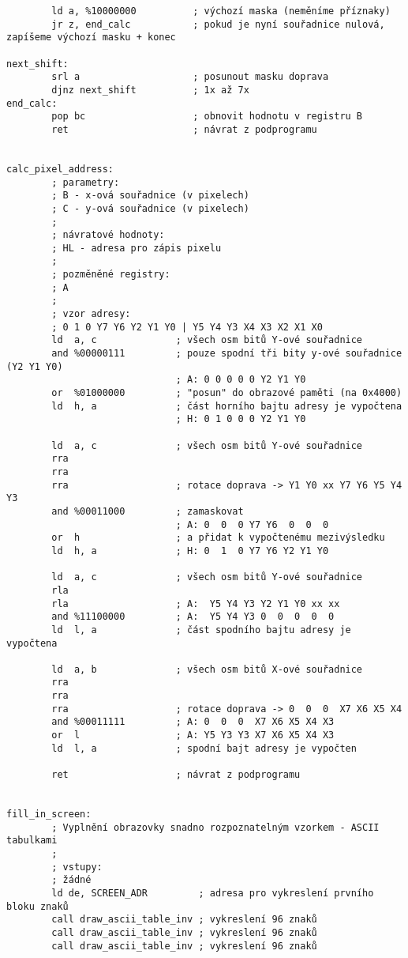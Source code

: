 \documentclass{article}
\begin{document}
\begin{verbatim}
        ld a, %10000000          ; výchozí maska (neměníme příznaky)
        jr z, end_calc           ; pokud je nyní souřadnice nulová, zapíšeme výchozí masku + konec
 
next_shift:
        srl a                    ; posunout masku doprava
        djnz next_shift          ; 1x až 7x
end_calc:
        pop bc                   ; obnovit hodnotu v registru B
        ret                      ; návrat z podprogramu
 
 
calc_pixel_address:
        ; parametry:
        ; B - x-ová souřadnice (v pixelech)
        ; C - y-ová souřadnice (v pixelech)
        ;
        ; návratové hodnoty:
        ; HL - adresa pro zápis pixelu
        ;
        ; pozměněné registry:
        ; A
        ;
        ; vzor adresy:
        ; 0 1 0 Y7 Y6 Y2 Y1 Y0 | Y5 Y4 Y3 X4 X3 X2 X1 X0
        ld  a, c              ; všech osm bitů Y-ové souřadnice
        and %00000111         ; pouze spodní tři bity y-ové souřadnice (Y2 Y1 Y0)
                              ; A: 0 0 0 0 0 Y2 Y1 Y0
        or  %01000000         ; "posun" do obrazové paměti (na 0x4000)
        ld  h, a              ; část horního bajtu adresy je vypočtena
                              ; H: 0 1 0 0 0 Y2 Y1 Y0
 
        ld  a, c              ; všech osm bitů Y-ové souřadnice
        rra
        rra
        rra                   ; rotace doprava -> Y1 Y0 xx Y7 Y6 Y5 Y4 Y3
        and %00011000         ; zamaskovat
                              ; A: 0  0  0 Y7 Y6  0  0  0
        or  h                 ; a přidat k vypočtenému mezivýsledku
        ld  h, a              ; H: 0  1  0 Y7 Y6 Y2 Y1 Y0
 
        ld  a, c              ; všech osm bitů Y-ové souřadnice
        rla
        rla                   ; A:  Y5 Y4 Y3 Y2 Y1 Y0 xx xx
        and %11100000         ; A:  Y5 Y4 Y3 0  0  0  0  0
        ld  l, a              ; část spodního bajtu adresy je vypočtena
 
        ld  a, b              ; všech osm bitů X-ové souřadnice
        rra
        rra
        rra                   ; rotace doprava -> 0  0  0  X7 X6 X5 X4
        and %00011111         ; A: 0  0  0  X7 X6 X5 X4 X3
        or  l                 ; A: Y5 Y3 Y3 X7 X6 X5 X4 X3
        ld  l, a              ; spodní bajt adresy je vypočten
 
        ret                   ; návrat z podprogramu
 
 
fill_in_screen:
        ; Vyplnění obrazovky snadno rozpoznatelným vzorkem - ASCII tabulkami
        ;
        ; vstupy:
        ; žádné
        ld de, SCREEN_ADR         ; adresa pro vykreslení prvního bloku znaků
        call draw_ascii_table_inv ; vykreslení 96 znaků
        call draw_ascii_table_inv ; vykreslení 96 znaků
        call draw_ascii_table_inv ; vykreslení 96 znaků

\end{verbatim}
\end{document}
